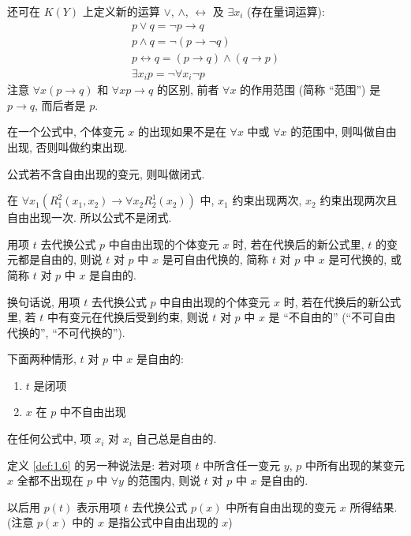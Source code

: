 \documentclass[
    mode=hazy,
    color=blue,
    device=normal,
    lang=cn
]{elegantnote}
\begin{document}
还可在 $K(Y)$ 上定义新的运算 $\lor$, $\land$, $\leftrightarrow$ 及 $\exists x_i$ (存在量词运算):
\begin{gather*}
    p\lor q = \lnot p \to q\\
    p\land q = \lnot (p\to \lnot q)\\
    p\leftrightarrow q = (p\to q)\land (q\to p)\\
    \exists x_i p=\lnot \forall x_i \lnot p
\end{gather*}
注意 $\forall x(p\to q)$ 和 $\forall xp\to q$ 的区别, 前者 $\forall x$ 的作用范围 (简称 ``范围'') 是 $p\to q$, 而后者是 $p$.
\begin{definition}[变元的自由出现与约束出现]
    在一个公式中, 个体变元 $x$ 的出现如果不是在 $\forall x$ 中或 $\forall x$ 的范围中, 则叫做自由出现, 否则叫做约束出现.
\end{definition}
\begin{definition}
    公式若不含自由出现的变元, 则叫做闭式.
\end{definition}
\begin{example}
    在 $\forall x_1 (R_1^2(x_1, x_2)\to \forall x_2 R_2^1(x_2))$ 中, $x_1$ 约束出现两次, $x_2$ 约束出现两次且自由出现一次. 所以公式不是闭式.
\end{example}
\begin{definition}\label{def:1.6}
    用项 $t$ 去代换公式 $p$ 中自由出现的个体变元 $x$ 时, 若在代换后的新公式里, $t$ 的变元都是自由的, 则说 $t$ 对 $p$ 中 $x$ 是可自由代换的, 简称 $t$ 对 $p$ 中 $x$ 是可代换的, 或简称 $t$ 对 $p$ 中 $x$ 是自由的.

    换句话说, 用项 $t$ 去代换公式 $p$ 中自由出现的个体变元 $x$ 时, 若在代换后的新公式里, 若 $t$ 中有变元在代换后受到约束, 则说 $t$ 对 $p$ 中 $x$ 是 ``不自由的'' (``不可自由代换的'', ``不可代换的'').
\end{definition}
下面两种情形, $t$ 对 $p$ 中 $x$ 是自由的:
\begin{enumerate}[label = $\arabic*^\circ$]
    \item $t$ 是闭项
    \item $x$ 在 $p$ 中不自由出现
\end{enumerate}
在任何公式中, 项 $x_i$ 对 $x_i$ 自己总是自由的.

定义 \ref{def:1.6} 的另一种说法是: 若对项 $t$ 中所含任一变元 $y$, $p$ 中所有出现的某变元 $x$ 全都不出现在 $p$ 中 $\forall y$ 的范围内, 则说 $t$ 对 $p$ 中 $x$ 是自由的.

以后用 $p(t)$ 表示用项 $t$ 去代换公式 $p(x)$ 中所有自由出现的变元 $x$ 所得结果. (注意 $p(x)$ 中的 $x$ 是指公式中自由出现的 $x$)
\end{document}
